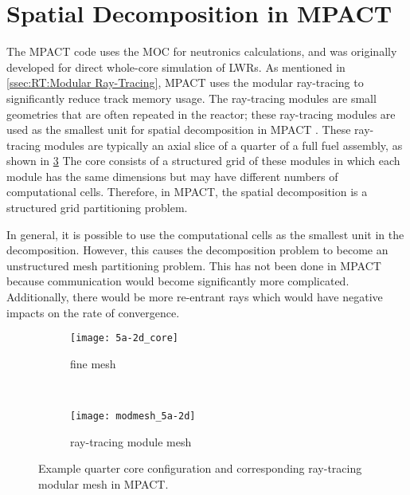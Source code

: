 {  \section{Spatial Decomposition in MPACT}{\label{sec:Spatial Decomposition:Spatial Decomposition in MPACT}
    The MPACT code uses the \ac{MOC} for neutronics calculations, and was originally developed for direct whole-core simulation of \acp{LWR}.
    As mentioned in \cref{ssec:RT:Modular Ray-Tracing}, MPACT uses the modular ray-tracing \cite{Saji2000} to significantly reduce track memory usage.
    The ray-tracing modules are small geometries that are often repeated in the reactor; these ray-tracing modules are used as the smallest unit for spatial decomposition in MPACT \cite{StimpsonPartitioning2017}.
    These ray-tracing modules are typically an axial slice of a quarter of a full fuel assembly, as shown in \cref{fig:Spatial Decomposition:5a-2d abstraction}
    The core consists of a structured grid of these modules in which each module has the same dimensions but may have different numbers of computational cells.
    Therefore, in MPACT, the spatial decomposition is a structured grid partitioning problem.

    In general, it is possible to use the computational cells as the smallest unit in the decomposition.
    However, this causes the decomposition problem to become an unstructured mesh partitioning problem.
    This has not been done in MPACT because communication would become significantly more complicated.
    Additionally, there would be more re-entrant rays which would have negative impacts on the rate of convergence.

    \begin{figure}
      \centering
      \begin{subfigure}[t]{0.45\textwidth}
        \centering
        \texttt{[image: 5a-2d\_core]}
        \caption{fine mesh\label{fig:Spatial Decomposition:5a-2d configuration}}
      \end{subfigure}%
      ~
      \begin{subfigure}[t]{0.45\textwidth}
        \centering
        \texttt{[image: modmesh\_5a-2d]}
        \caption{ray-tracing module mesh\label{fig:Spatial Decomposition:5a-2d modular mesh}}
      \end{subfigure}
      \caption{Example quarter core configuration and corresponding ray-tracing modular mesh in MPACT. \label{fig:Spatial Decomposition:5a-2d abstraction}}
    \end{figure}

}}
